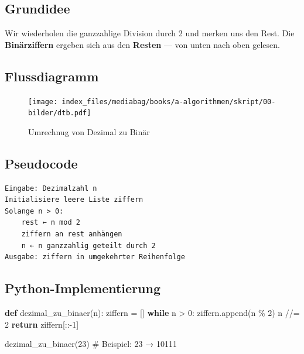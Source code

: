 \documentclass[
  letterpaper,
  DIV=11,
  numbers=noendperiod]{scrreprt}
\newenvironment{Shaded}{\begin{snugshade}}{\end{snugshade}}
\newcommand{\CommentTok}[1]{\textcolor[rgb]{0.37,0.37,0.37}{#1}}
\newcommand{\ControlFlowTok}[1]{\textcolor[rgb]{0.00,0.23,0.31}{\textbf{#1}}}
\newcommand{\DecValTok}[1]{\textcolor[rgb]{0.68,0.00,0.00}{#1}}
\newcommand{\KeywordTok}[1]{\textcolor[rgb]{0.00,0.23,0.31}{\textbf{#1}}}
\newcommand{\NormalTok}[1]{\textcolor[rgb]{0.00,0.23,0.31}{#1}}
\newcommand{\OperatorTok}[1]{\textcolor[rgb]{0.37,0.37,0.37}{#1}}
\begin{document}
\subsection{Grundidee}\label{grundidee-1}

Wir wiederholen die ganzzahlige Division durch 2 und merken uns den
Rest. Die \textbf{Binärziffern} ergeben sich aus den \textbf{Resten} ---
von unten nach oben gelesen.

\subsection{Flussdiagramm}\label{flussdiagramm}

\begin{figure}[H]

{\centering \texttt{[image: index\_files/mediabag/books/a-algorithmen/skript/00-bilder/dtb.pdf]}

}

\caption{Umrechnug von Dezimal zu Binär}

\end{figure}%

\subsection{Pseudocode}\label{pseudocode}

\begin{verbatim}
Eingabe: Dezimalzahl n
Initialisiere leere Liste ziffern
Solange n > 0:
    rest ← n mod 2
    ziffern an rest anhängen
    n ← n ganzzahlig geteilt durch 2
Ausgabe: ziffern in umgekehrter Reihenfolge
\end{verbatim}

\subsection{Python-Implementierung}\label{python-implementierung}

\begin{Shaded}
\begin{Highlighting}[]
\KeywordTok{def}\NormalTok{ dezimal\_zu\_binaer(n):}
\NormalTok{    ziffern }\OperatorTok{=}\NormalTok{ []}
    \ControlFlowTok{while}\NormalTok{ n }\OperatorTok{\textgreater{}} \DecValTok{0}\NormalTok{:}
\NormalTok{        ziffern.append(n }\OperatorTok{\%} \DecValTok{2}\NormalTok{)}
\NormalTok{        n }\OperatorTok{//=} \DecValTok{2}
    \ControlFlowTok{return}\NormalTok{ ziffern[::}\OperatorTok{{-}}\DecValTok{1}\NormalTok{]}

\NormalTok{dezimal\_zu\_binaer(}\DecValTok{23}\NormalTok{)  }\CommentTok{\# Beispiel: 23 → 10111}
\end{Highlighting}
\end{Shaded}
\end{document}

